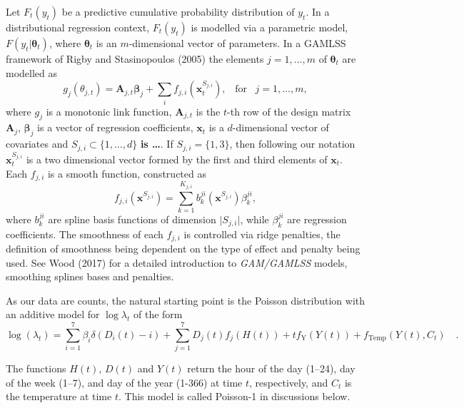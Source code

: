 \documentclass[]{elsarticle} %
\begin{document}
Let \(F_t(y_t)\) be a predictive cumulative probability distribution of
\(y_t\). In a distributional regression context, \(F_t(y_t)\) is modelled
via a parametric model, \(F(y_t|\bm \theta_t)\), where \(\bm \theta_t\) is
an \(m\)-dimensional vector of parameters. In a GAMLSS framework of
Rigby and Stasinopoulos (2005) the elements \(j=1,...,m\) of \(\bm \theta_t\) are modelled as
\begin{equation}
    g_j(\theta_{j,t})=\mathbf{A}_{j,t} \bm{\beta}_j + \sum_{i} f_{j,i}({\bm x}^{S_{j,i}}_t), \;\;\; \text{for} \;\;\; j = 1, \dots, m,
    \label{eq:basicGAM}
\end{equation} where \(g_j\) is a monotonic link function,
\(\mathbf{A}_{j,t}\) is the \(t\)-th row of the design matrix
\(\mathbf{A}_j\), \(\bm \beta_j\) is a vector of regression coefficients,
\(\bm x_t\) is a \(d\)-dimensional vector of covariates and
\(S_{j,i} \subset \{1, \dots, d\}\) \textbf{is \ldots{}}. If \(S_{j,i} = \{1, 3\}\),
then following our notation \({\bm x}_{t}^{S_{j,i}}\) is a two dimensional
vector formed by the first and third elements of \(\bm x_t\). Each
\(f_{j,i}\) is a smooth function, constructed as \begin{equation}
    f_{j,i}(\bm x^{S_{j,i}}) = \sum_{k=1}^{K_{j,i}} b^{ji}_k (\bm x^{S_{j,i}}) \beta_k^{ji},
    \label{eq:smmothfunction}
\end{equation} where \(b^{ji}_k\) are spline basis functions of dimension
\(\vert S_{j,i} \vert\), while \(\beta_k^{ji}\) are regression coefficients.
The smoothness of each \(f_{j,i}\) is controlled via ridge penalties, the
definition of smoothness being dependent on the type of effect and
penalty being used. See Wood (2017) for a detailed introduction to
\emph{GAM/GAMLSS} models, smoothing splines bases and penalties.

As our data are counts, the natural starting point is the Poisson
distribution with an additive model for \(\log \lambda_t\) of the form
\begin{equation}
  \log(\lambda_t) = \sum_{i=1}^7 \beta_i \delta(D_i(t)-i) + \sum_{j=1}^7 D_j(t) f_j(H(t)) + t f_\text{Y}(Y(t)) + f_\text{Temp}(Y(t),C_t) \quad .
 \label{eq:additivemodel}
\end{equation}

The functions \(H(t)\), \(D(t)\) and \(Y(t)\) return the hour of the day
(1--24), day of the week (1--7), and day of the year (1-366) at time
\(t\), respectively, and \(C_t\) is the temperature at time \(t\). This model
is called Poisson-1 in discussions below.
\end{document}
